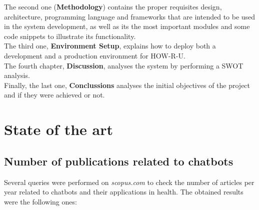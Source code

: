 \documentclass[12pt,english]{article}
\begin{document}
The second one (\textbf{Methodology}) contains the proper requisites design, architecture, programming language and frameworks that are intended to be used in the system development, as well as its the most important modules and some code snippets to illustrate its functionality.\\

The third one, \textbf{Environment Setup}, explains how to deploy both a development and a production environment for HOW-R-U.\\

The fourth chapter, \textbf{Discussion}, analyses the system by performing a SWOT analysis.\\

Finally, the last one, \textbf{Conclussions} analyses the initial objectives of the project and if they were achieved or not.



\newpage

\section{State of the art}

\subsection{Number of publications related to chatbots}

Several queries were performed on \textit{scopus.com} to check the number of articles per year related to chatbots and their applications in health. The obtained results were the following ones:
\end{document}
